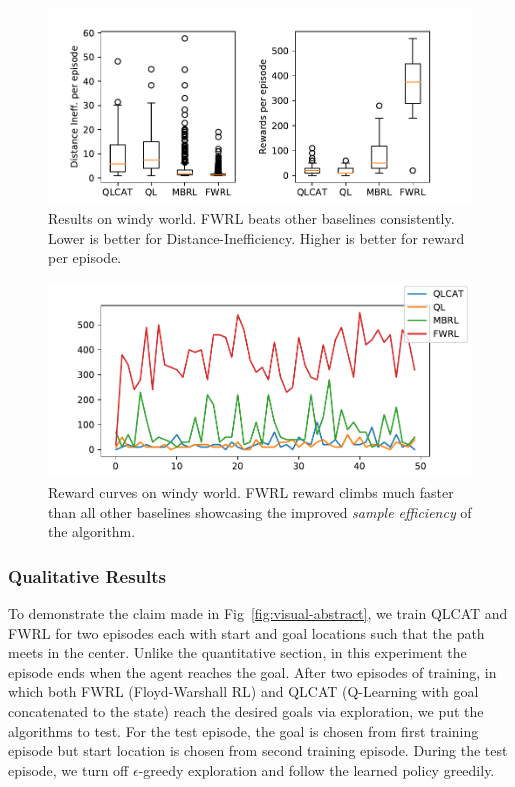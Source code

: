\begin{figure}
  \includegraphics[width=\columnwidth]{./media/metrics-windy-world.pdf}
  \caption{Results on windy world. FWRL beats other baselines
    consistently. Lower is better for Distance-Inefficiency. Higher
    is better for reward per episode. }
  \label{fig:ql-fw-windy-world-results}%
\end{figure}

\begin{figure}
  \includegraphics[width=\columnwidth]{./media/rewards-metrics-windy-world.pdf}
  \caption{Reward curves on windy world. FWRL reward climbs much
    faster than all other baselines showcasing the improved \emph{sample
      efficiency} of the algorithm.}
  \label{fig:ql-fw-windy-world-reward-curves}%
\end{figure}


\subsubsection{Qualitative Results}
To demonstrate the claim made in Fig~\ref{fig:visual-abstract}, we train QLCAT
and FWRL for two episodes each with start and goal locations such that the path
meets in the center. Unlike the quantitative section, in this experiment the
episode ends when the agent reaches the goal.
After two episodes of training, in which both FWRL (Floyd-Warshall RL) and QLCAT
(Q-Learning with goal concatenated to the state) reach the desired
goals via exploration, we put the algorithms to test.
For the test episode, the goal is chosen from first training episode but start
location is chosen from second training episode.
During the test episode,
we turn off $\epsilon$-greedy exploration and follow the learned policy
greedily.


